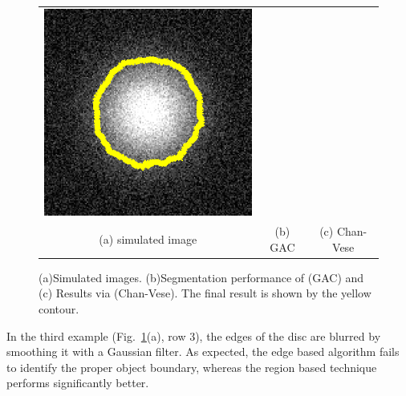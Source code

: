 \begin{figure}[htb]
\begin{tabular}{@{}ccc@{}}
\includegraphics[height=0.3\textwidth]{images/demo/GACvsCV/CV_gauss_noisy}	\\
(a) simulated image & (b) GAC\cite{caselles_GAC} & (c) Chan-Vese\cite{chan_vese}
\end{tabular}
\caption[Edge based model vs region based model]{(a)Simulated images. (b)Segmentation performance of (GAC\cite{caselles_GAC}) and (c) Results via (Chan-Vese\cite{chan_vese}). The final result is shown by the yellow contour.}
\label{fig:GACvsCV}
\end{figure}
\clearpage
In the third example (Fig.~\ref{fig:GACvsCV}(a), row 3), the edges of the disc are blurred by smoothing it with a Gaussian filter. As expected, the edge based algorithm fails to identify the proper object boundary, whereas the region based technique performs significantly better.

